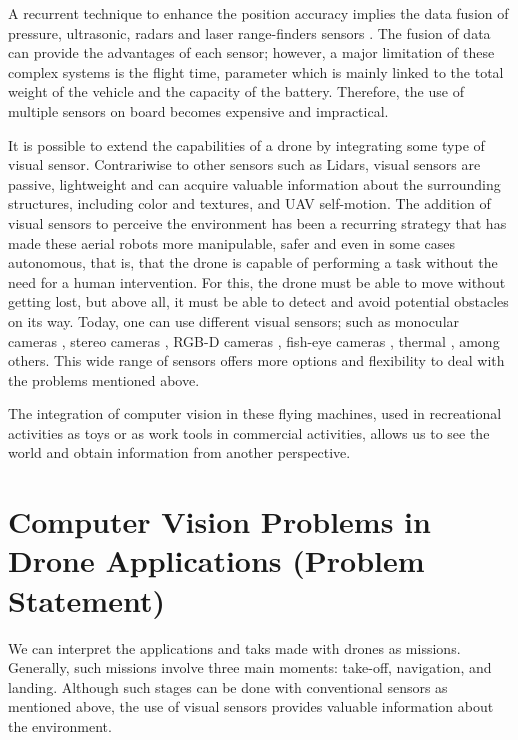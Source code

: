 A recurrent technique to enhance the position accuracy implies the data fusion of pressure, ultrasonic, radars and laser range-finders sensors \citep{Tomic.Schmid.ea:IRAM:2012}. The fusion of data can provide the advantages of each sensor; however, a major limitation of these complex systems is the flight time, parameter which is mainly linked to the total weight of the vehicle and the capacity of the battery. Therefore, the use of multiple sensors on board becomes expensive and impractical.

It is possible to extend the capabilities of a drone by integrating some type of visual sensor. Contrariwise to other sensors such as Lidars, visual sensors are passive, lightweight and can acquire valuable information about the surrounding structures, including color and textures, and UAV self-motion. The addition of visual sensors to perceive the environment has been a recurring strategy that has made these aerial robots more manipulable, safer and even in some cases autonomous, that is, that the drone is capable of performing a task without the need for a human intervention. For this, the drone must be able to move without getting lost, but above all, it must be able to detect and avoid potential obstacles on its way. 
Today, one can use different visual sensors; such as monocular cameras \citep{Padhy.Xia.ea:TSC:2018}, stereo cameras \citep{Seitz.Curless.ea:CVPR:2006}, RGB-D cameras \citep{Huang.Bachrach.ea:RobR:2017}, fish-eye cameras \citep{Hrabar.Sukhatme:IROS:2004}, thermal \citep{Gaszczak.Breckon.ea:IRCV:2011}, among others. This wide range of sensors offers more options and flexibility to deal with the problems mentioned above. 

The integration of computer vision in these flying machines, used in recreational activities as toys or as work tools in commercial activities, allows us to see the world and obtain information from another perspective.
 
\section*{Computer Vision Problems in Drone Applications (Problem Statement)}
 
We can interpret the applications and taks made with drones as missions. Generally, such missions involve three main moments: take-off, navigation, and landing. Although such stages can be done with conventional sensors as mentioned above, the use of visual sensors provides valuable information about the environment. 

